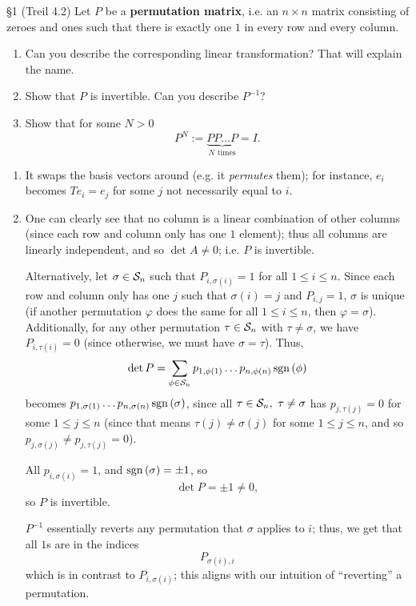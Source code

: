 \documentclass{homework}
\begin{document}
\begin{problem}{\S 1}
  (Treil 4.2) Let $P$ be a \textbf{permutation matrix}, i.e. an $n\times n$ matrix consisting of
  zeroes and ones such that there is exactly one $1$ in every row and every column.
  \begin{enumerate}[label=(\alph*)]
    \item Can you describe the corresponding linear transformation? That will explain the name.
    \item Show that $P$ is invertible. Can you describe $P^{-1}$?
    \item Show that for some $N>0$ \[
        P^N := \underbrace{PP\ldots P}_\text{$N$ times}=I
    .\]
  \end{enumerate}
\end{problem}

\begin{solution}
  \begin{enumerate}[label=(\alph*)]
    \item It swaps the basis vectors around (e.g. it \textit{permutes} them); for instance, $e_i$
      becomes $Te_i=e_j$ for some $j$ not necessarily equal to $i$.
    \item One can clearly see that no column is a linear combination of other columns (since each
      row and column only has one $1$ element); thus all columns are linearly independent, and so
      $\det{A}\neq 0$; i.e. $P$ is invertible.

      Alternatively, let $\sigma\in \mathcal{S}_n$ such that $P_{i,\sigma(i)}=1$ for all $1\le i\le n$.
      Since each row and column only has one $j$ such that $\sigma(i)=j$ and $P_{i,j}=1$, $\sigma$
      is unique (if another permutation $\varphi$ does the same for all $1\le i\le n$, then
      $\varphi=\sigma$).  Additionally, for any other permutation $\tau\in \mathcal{S}_n$ with $\tau\neq
      \sigma$, we have $P_{i,\tau(i)}=0$ (since otherwise, we must have $\sigma=\tau$). Thus, \[
        \det{P}=\sum_{\phi\in \mathcal{S}_n} p_{1,\phi(1)}\ldots p_{n,\phi(n)}\operatorname{sgn}{(\phi)}
      \] becomes $p_{1,\sigma(1)}\ldots p_{n,\sigma(n)}\operatorname{sgn}{(\sigma)}$, since all $\tau\in
      \mathcal{S}_n,\ \tau\neq \sigma$ has $p_{j,\tau(j)}=0$ for some $1\le j\le n$ (since that means
      $\tau(j)\neq \sigma(j)$ for some $1\le j\le n$, and so $p_{j,\sigma(j)}\neq p_{j,\tau(j)}=0$).
      
      All $p_{i,\sigma(i)}=1$, and $\operatorname{sgn}{(\sigma)}=\pm 1$, so \[
        \det{P}=\pm 1\neq 0
      ,\] so $P$ is invertible.

      $P^{-1}$ essentially reverts any permutation that $\sigma$ applies to $i$; thus, we get that
      all $1$s are in the indices \[
        P_{\sigma(i),i}
      \] which is in contrast to $P_{i,\sigma(i)}$; this aligns with our intuition of ``reverting''
      a permutation.


\end{enumerate}
\end{solution}
\end{document}
